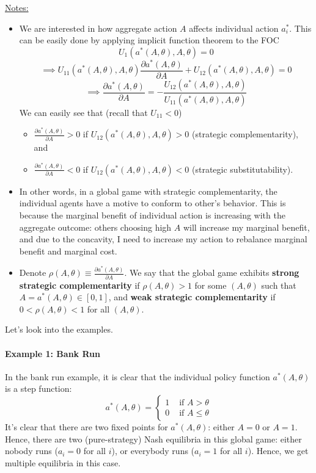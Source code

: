 \documentclass[12pt]{article}
\begin{document}
\underline{Notes:}
\begin{itemize}
	\item We are interested in how aggregate action $A$ affects individual action $a_i^*$. This can be easily done by applying implicit function theorem to the FOC
	\[U_1(a^*(A, \theta), A, \theta) = 0\]
	\[\implies U_{11}(a^*(A, \theta), A, \theta) \frac{\partial a^*(A, \theta)}{\partial A} + U_{12}(a^*(A, \theta), A, \theta) = 0 \]
	\[\implies \frac{\partial a^*(A, \theta)}{\partial A} = - \frac{U_{12}(a^*(A, \theta), A, \theta)}{U_{11}(a^*(A, \theta), A, \theta)}\]
	We can easily see that (recall that $U_{11} < 0$)
	\begin{itemize}
		\item $\frac{\partial a^*(A, \theta)}{\partial A} > 0$ if $U_{12}(a^*(A, \theta), A, \theta) > 0$ (strategic complementarity), and
		\item $\frac{\partial a^*(A, \theta)}{\partial A} < 0$ if $U_{12}(a^*(A, \theta), A, \theta) < 0$ (strategic substitutability).
	\end{itemize}
\item In other words, in a global game with strategic complementarity, the individual agents have a motive to conform to other's behavior. This is because the marginal benefit of individual action is increasing with the aggregate outcome: others choosing high $A$ will increase my marginal benefit, and due to the concavity, I need to increase my action to rebalance marginal benefit and marginal cost. 
\item Denote $\rho(A, \theta) \equiv \frac{\partial a^*(A, \theta)}{\partial A}$. We say that the global game exhibits \textbf{strong strategic complementarity} if $\rho(A, \theta) > 1$ for some $(A, \theta)$ such that $A = a^*(A, \theta) \in [0,1]$, and \textbf{weak strategic complementarity} if $0< \rho(A, \theta) < 1$ for all $(A, \theta)$.
\end{itemize}

Let's look into the examples.

\paragraph{Example 1: Bank Run \\ [6pt]}

In the bank run example, it is clear that the individual policy function $a^*(A, \theta)$ is a step function:
\begin{equation}
	a^*(A, \theta) = \begin{cases}
		1 & \text{ if } A > \theta \\
		0 & \text{ if } A \leq \theta
	\end{cases}
\end{equation}
It's clear that there are two fixed points for $a^*(A, \theta)$: either $A = 0$ or $A = 1$. Hence, there are two (pure-strategy) Nash equilibria in this global game: either nobody runs ($a_i = 0$ for all $i$), or everybody runs ($a_{i} = 1$ for all $i$). Hence, we get multiple equilibria in this case.
\end{document}
